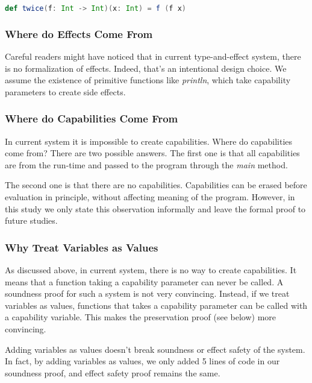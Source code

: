 \begin{lstlisting}[language=Scala]
  def twice(f: Int -> Int)(x: Int) = f (f x)
\end{lstlisting}

\subsubsection{Where do Effects Come From}

Careful readers might have noticed that in current type-and-effect
system, there is no formalization of effects. Indeed, that's an
intentional design choice. We assume the existence of primitive
functions like \emph{println}, which take capability parameters to
create side effects.


\subsubsection{Where do Capabilities Come From}

In current system it is impossible to create capabilities. Where do
capabilities come from?  There are two possible answers. The first one
is that all capabilities are from the run-time and passed to the
program through the \emph{main} method.

The second one is that there are no capabilities. Capabilities can be
erased before evaluation in principle, without affecting meaning of
the program. However, in this study we only state this observation
informally and leave the formal proof to future studies.

\subsubsection{Why Treat Variables as Values}

As discussed above, in current system, there is no way to create
capabilities. It means that a function taking a capability parameter
can never be called. A soundness proof for such a system is not very
convincing. Instead, if we treat variables as values, functions that
takes a capability parameter can be called with a capability
variable. This makes the preservation proof (see below) more
convincing.

Adding variables as values doesn't break soundness or effect safety of
the system. In fact, by adding variables as values, we only added 5
lines of code in our soundness proof, and effect safety proof remains
the same.

